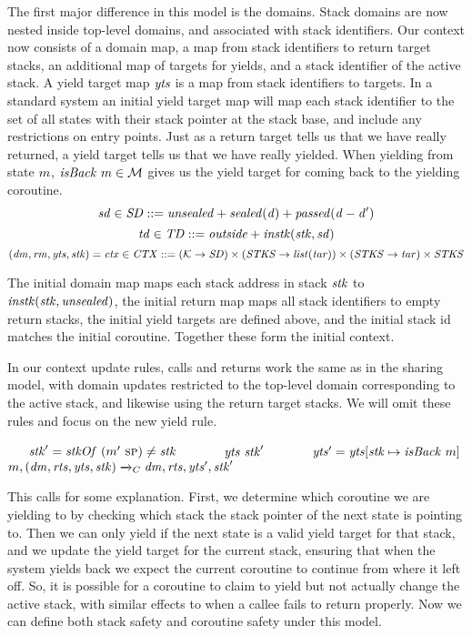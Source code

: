 \documentclass[acmsmall,review,anonymous]{acmart}\settopmatter{printfolios=true,printccs=false,printacmref=false}
\begin{document}
{The first major difference in this model is the domains. Stack domains are now nested inside
top-level domains, and associated with stack identifiers.
Our context now consists of a domain map, a map from stack identifiers to return target stacks,
an additional map of targets for yields, and a stack identifier of the active stack.
A yield target map \(\mathit{yts}\) is a map from stack identifiers to targets.
In a standard system an initial yield target map will map each stack identifier to the
set of all states with their stack pointer at the stack base, and include any restrictions
on entry points. Just as a return target tells us that we have really returned, a yield
target tells us that we have really yielded. When yielding from state \(m\),
\(\mathit{isBack} ~ m \in {\mathcal M}\) gives us the yield target for coming back to the yielding
coroutine.
%
\[\mathit{sd} \in \mathit{SD} ::= \mathit{unsealed} + \mathit{sealed(d)} + \mathit{passed(d-d')}\]
\[\mathit{td} \in \mathit{TD} ::= \mathit{outside} + \mathit{instk}(\mathit{stk},\mathit{sd})\]
\[(\mathit{dm},\mathit{rm},\mathit{yts},\mathit{stk}) = \mathit{ctx} \in \mathit{CTX} ::=
 ({\mathcal K} \rightarrow \mathit{SD}) \times
(\mathit{STKS} \rightarrow \mathit{list}(\mathit{tar})) \times (\mathit{STKS} \rightarrow \mathit{tar}) \times \mathit{STKS}\]


The initial domain map maps each stack address in stack \(\mathit{stk}\) to
\(\mathit{instk}(\mathit{stk},\mathit{unsealed})\), the initial return map maps all stack identifiers to empty
return stacks, the initial yield targets are defined above, and the initial stack id matches the initial
coroutine. Together these form the initial context.

In our context update rules, calls and returns work the same as in the sharing model,
with domain updates restricted to the top-level domain corresponding to the active stack,
and likewise using the return target stacks. We will omit these rules and focus on the new yield rule.

             {~ ~ \(\mathit{stk}' = \mathit{stkOf} ~ (m'~ \textsc{sp}) \not = \mathit{stk}\) ~ ~}
             {~ ~ \(\mathit{yts} ~ \mathit{stk}'\) ~ ~}
             {~ ~ \(\mathit{yts}' = \mathit{yts}[\mathit{stk} \mapsto \mathit{isBack} ~ m]\)}
             {\(m,(\mathit{dm},\mathit{rts},\mathit{yts},\mathit{stk}) \xrightarrow{}_C \mathit{dm},\mathit{rts},\mathit{yts}',\mathit{stk}'\)}

This calls for some explanation. First, we determine which coroutine we are yielding to by
checking which stack the stack pointer of the next state is pointing to. Then we can only yield
if the next state is a valid yield target for that stack, and we update the yield target for
the current stack, ensuring that when the system yields back we expect the current coroutine
to continue from where it left off. So, it is possible for a coroutine to claim to yield
but not actually change the active stack, with similar effects to when a callee fails
to return properly. Now we can define both stack safety and coroutine safety under this model.

}
\end{document}
